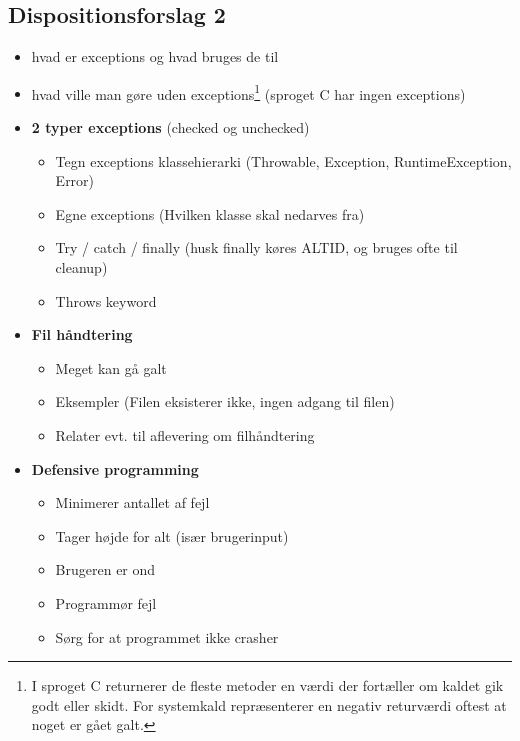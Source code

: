 \subsection{Dispositionsforslag 2}

\begin{itemize}
    \item hvad er exceptions og hvad bruges de til
    \item hvad ville man gøre uden exceptions\footnote{I sproget C returnerer de fleste metoder en værdi der fortæller om kaldet gik godt eller skidt. For systemkald repræsenterer en negativ returværdi oftest at noget er gået galt.} (sproget C har ingen exceptions)
    \item \textbf{2 typer exceptions} (checked og unchecked)
    \begin{itemize}
        \item Tegn exceptions klassehierarki (Throwable, Exception, RuntimeException, Error)
        \item Egne exceptions (Hvilken klasse skal nedarves fra)
        \item Try / catch / finally (husk finally køres ALTID, og bruges ofte til cleanup)
        \item Throws keyword
    \end{itemize}
    
    \item \textbf{Fil håndtering}
    \begin{itemize}
        \item Meget kan gå galt
        \item Eksempler (Filen eksisterer ikke, ingen adgang til filen)
        \item Relater evt. til aflevering om filhåndtering
    \end{itemize}
    
    \item \textbf{Defensive programming}
    \begin{itemize}
        \item Minimerer antallet af fejl
        \item Tager højde for alt (især brugerinput)
        \item Brugeren er ond
        \item Programmør fejl
        \item Sørg for at programmet ikke crasher
    \end{itemize}
\end{itemize}
